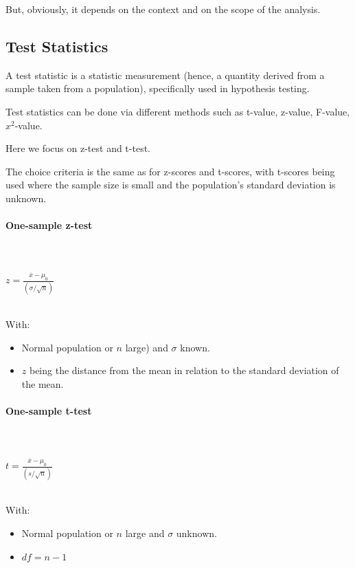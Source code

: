 \documentclass{article}
\begin{document}
But, obviously, it depends on the context and on the scope of the analysis. 

\subsection{Test Statistics}
A test statistic is a statistic measurement (hence, a quantity derived from a sample taken from a population), specifically used in hypothesis testing. 

Test statistics can be done via different methods such as t-value, z-value, F-value, $x^2$-value.

Here we focus on z-test and t-test. 

The choice criteria is the same as for z-scores and t-scores, with t-scores being used where the sample size is small and the population's standard deviation is unknown. 

\paragraph{One-sample z-test}\mbox{} \\
\mbox{} \\

$ \displaystyle z={\frac {{\overline {x}}-\mu _{0}}{({\sigma }/{\sqrt {n}})}} $

\mbox{} \\

With:
\begin{itemize}
    \item Normal population or $n$ large) and $\sigma$ known.
    \item $z$ being the distance from the mean in relation to the standard deviation of the mean.
\end{itemize}

\paragraph{One-sample t-test}\mbox{} \\
\mbox{} \\

$ t=\frac{\overline{x}-\mu_0} {( s / \sqrt{n} )} $ 

\mbox{} \\

With:
\begin{itemize}
    \item Normal population or $n$ large and $\sigma$ unknown.
    \item $df = n-1$
\end{itemize}
\end{document}
